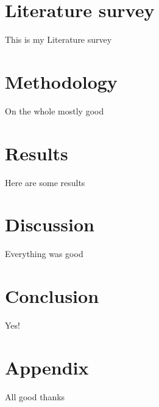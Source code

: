 \documentclass[12pt,a4paper]{article}
\begin{document}
\section{Literature survey}
\citet[p.~2]{latex:guide}
 This is my Literature survey

\section{Methodology}

On the whole mostly good 

\section{Results}

Here are some results 

\section{Discussion}

Everything was good

\section{Conclusion}

Yes!

\section{Appendix}

All good thanks

\clearpage



\end{document}
